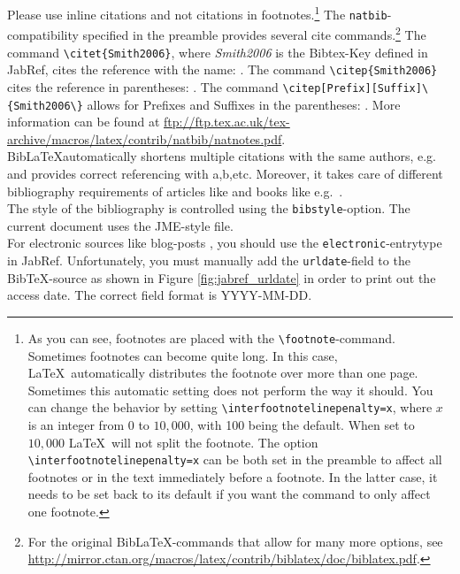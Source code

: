 \documentclass[a4paper,12pt]{scrartcl} %
\begin{document}
Please use inline citations and not citations in footnotes.\footnote{As you can see, footnotes are placed with the \texttt{\textbackslash footnote{}}-command. Sometimes footnotes can become quite long. In this case, \LaTeX\ automatically distributes the footnote over more than one page. Sometimes this automatic setting does not perform the way it should. You can change the behavior by setting \texttt{\textbackslash interfootnotelinepenalty=x}, where $x$ is an integer from $0$ to $10{,}000$, with 100 being the default. When set to $10{,}000$ \LaTeX\ will not split the footnote. The option \texttt{\textbackslash interfootnotelinepenalty=x} can be both set in the preamble to affect all footnotes or in the text immediately before a footnote. In the latter case, it needs to be set back to its default if you want the command to only affect one footnote.}   The \texttt{natbib}-compatibility specified in the preamble provides several cite commands.\footnote{For the original Bib\LaTeX-commands that allow for many more options, see \url{http://mirror.ctan.org/macros/latex/contrib/biblatex/doc/biblatex.pdf}.} The command \texttt{\textbackslash citet\{Smith2006\}}, where \textit{Smith2006} is the Bibtex-Key defined in JabRef, cites the reference with the name: \citet{Smith2006}. The command \texttt{\textbackslash citep\{Smith2006\}} cites the reference in parentheses: \citep{Smith2006}. The command \verb|\citep[Prefix][Suffix]\{Smith2006\}| allows for Prefixes and Suffixes in the parentheses: \citep[see e.g.][pp. 1-4]{Smith2006}. More information can be found at \url{ftp://ftp.tex.ac.uk/tex-archive/macros/latex/contrib/natbib/natnotes.pdf}.\\

Bib\LaTeX automatically shortens multiple citations with the same authors, e.g.\ \citep{SGU2004JET,SGU2004,SGU2009,SGU2011} and provides correct referencing with a,b,etc. Moreover, it takes care of different bibliography requirements of articles like \citet{SGU2004} and books like e.g.\ \citet{SGU2005}.\\
The style of the bibliography is controlled using the \verb|bibstyle|-option. The current document uses the JME-style file.\\

For electronic sources like blog-posts \citep[e.g.\ ][]{Krugman2012}, you should use the \texttt{electronic}-entrytype in JabRef. Unfortunately, you must manually add the \texttt{urldate}-field to the Bib\TeX-source as shown in Figure \ref{fig:jabref_urldate} in order to print out the access date. The correct field format is YYYY-MM-DD.
\end{document}
